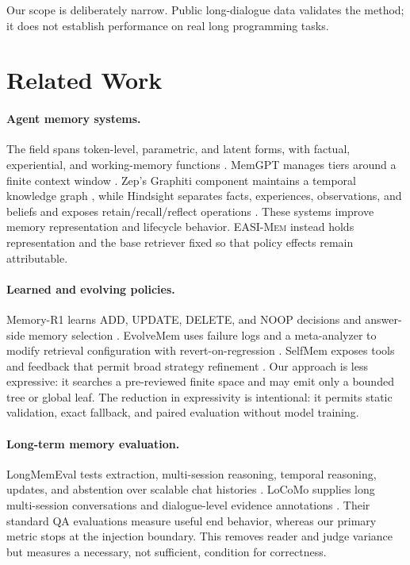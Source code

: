 \documentclass[10pt]{article}
\newcommand{\method}{\textsc{EASI-Mem}\xspace}
\begin{document}
Our scope is deliberately narrow. Public long-dialogue data validates the
method; it does not establish performance on real long programming tasks.

\section{Related Work}

\paragraph{Agent memory systems.}
The field spans token-level, parametric, and latent forms, with factual,
experiential, and working-memory functions \citep{hu2025memorysurvey}.
MemGPT manages tiers around a finite context window \citep{packer2023memgpt}.
Zep's Graphiti component maintains a temporal knowledge graph
\citep{rasmussen2025zep}, while Hindsight separates facts, experiences,
observations, and beliefs and exposes retain/recall/reflect operations
\citep{latimer2025hindsight}. These systems improve memory representation and
lifecycle behavior. \method instead holds representation and the base
retriever fixed so that policy effects remain attributable.

\paragraph{Learned and evolving policies.}
Memory-R1 learns ADD, UPDATE, DELETE, and NOOP decisions and answer-side memory
selection \citep{yan2025memoryr1}. EvolveMem uses failure logs and a
meta-analyzer to modify retrieval configuration with revert-on-regression
\citep{liu2026evolvemem}. SelfMem exposes tools and feedback that permit broad
strategy refinement \citep{yang2026selfmem}. Our approach is less expressive:
it searches a pre-reviewed finite space and may emit only a bounded tree or
global leaf. The reduction in expressivity is intentional: it permits static
validation, exact fallback, and paired evaluation without model training.

\paragraph{Long-term memory evaluation.}
LongMemEval tests extraction, multi-session reasoning, temporal reasoning,
updates, and abstention over scalable chat histories
\citep{wu2024longmemeval}. LoCoMo supplies long multi-session conversations and
dialogue-level evidence annotations \citep{maharana2024locomo}. Their standard
QA evaluations measure useful end behavior, whereas our primary metric stops at
the injection boundary. This removes reader and judge variance but measures a
necessary, not sufficient, condition for correctness.
\end{document}
